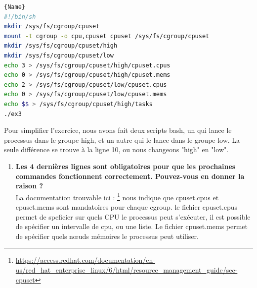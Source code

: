 \documentclass[
	a4paper, %
	10pt, %
]{CSUniSchoolLabReport}
\begin{document}
\begin{lstlisting}[language=bash, firstnumber=1]{Name}
#!/bin/sh
mkdir /sys/fs/cgroup/cpuset
mount -t cgroup -o cpu,cpuset cpuset /sys/fs/cgroup/cpuset
mkdir /sys/fs/cgroup/cpuset/high
mkdir /sys/fs/cgroup/cpuset/low
echo 3 > /sys/fs/cgroup/cpuset/high/cpuset.cpus
echo 0 > /sys/fs/cgroup/cpuset/high/cpuset.mems
echo 2 > /sys/fs/cgroup/cpuset/low/cpuset.cpus
echo 0 > /sys/fs/cgroup/cpuset/low/cpuset.mems
echo $$ > /sys/fs/cgroup/cpuset/high/tasks
./ex3
\end{lstlisting}
Pour simplifier l'exercice, nous avons fait deux scripts bash, un qui lance le processus dans le groupe high, et un autre qui le lance dans le groupe low.
La seule diff\'erence se trouve \`a la ligne 10, ou nous changeons "high" en "low".


\begin{enumerate}[label=\textbf{\arabic*}]
	\item \textbf{Les 4 dernières lignes sont obligatoires pour que les prochaines commandes fonctionnent correctement. Pouvez-vous en donner la raison ?}\\
	La documentation trouvable ici : \footnote{\href{https://access.redhat.com/documentation/en-us/red_hat_enterprise_linux/6/html/resource_management_guide/sec-cpuset}{https://access.redhat.com/documentation/en-us/red\_hat\_enterprise\_linux/6/html/resource\_management\_guide/sec-cpuset}}
	nous indique que cpuset.cpus et cpuset.mems sont mandatoires pour chaque cgroup.
	le fichier cpuset.cpus permet de speficier sur quels CPU le processus peut s'ex\'ecuter, il est possible de sp\'ecifier un intervalle de cpu, ou une liste.
	Le fichier cpuset.mems permet de sp\'ecifier quels n\oe{}uds m\'emoires le processus peut utiliser.
	

\end{enumerate}
\end{document}
